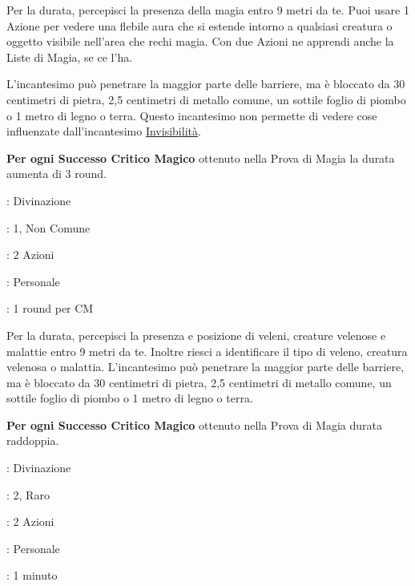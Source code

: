 \begin{multicols}{2}
Per la durata, percepisci la presenza della magia entro 9 metri da te. Puoi usare 1 Azione per vedere una flebile aura che si estende intorno a qualsiasi creatura o oggetto visibile nell'area che rechi magia. Con due Azioni ne apprendi anche la Liste di Magia, se ce l'ha.

L'incantesimo può penetrare la maggior parte delle barriere, ma è bloccato da 30 centimetri di pietra, 2,5 centimetri di metallo comune, un sottile foglio di piombo o 1 metro di legno o terra. Questo incantesimo non permette di vedere cose influenzate dall'incantesimo \hyperlink{Invisibilità}{Invisibilità}.

\textbf{Per ogni Successo Critico Magico} ottenuto nella Prova di Magia la durata aumenta di 3 round.

\noindent\colorbox{OBSSgold!10}{
\begin{minipage}{0.95\linewidth}
\begin{description}[noitemsep, topsep=0pt, parsep=0pt, partopsep=0pt, leftmargin=0cm, labelwidth=1.3cm]
	\item[\textbf{Lista}]: Divinazione
	\item[\textbf{Livello}]: 1, Non Comune
	\item[\textbf{Lancio}]: 2 Azioni
	\item[\textbf{Gittata}]: Personale
	\item[\textbf{Durata}]: 1 round per CM
\end{description}
\end{minipage}}\smallskip

Per la durata, percepisci la presenza e posizione di veleni, creature velenose e malattie entro 9 metri da te. Inoltre riesci a identificare il tipo di veleno, creatura velenosa o malattia. L'incantesimo può penetrare la maggior parte delle barriere, ma è bloccato da 30 centimetri di pietra, 2,5 centimetri di metallo comune, un sottile foglio di piombo o 1 metro di legno o terra.

\textbf{Per ogni Successo Critico Magico} ottenuto nella Prova di Magia durata raddoppia.

\noindent\colorbox{OBSSgold!10}{
\begin{minipage}{0.95\linewidth}
\begin{description}[noitemsep, topsep=0pt, parsep=0pt, partopsep=0pt, leftmargin=0cm, labelwidth=1.3cm]
	\item[\textbf{Lista}]: Divinazione
	\item[\textbf{Livello}]: 2, Raro
	\item[\textbf{Lancio}]: 2 Azioni
	\item[\textbf{Gittata}]: Personale
	\item[\textbf{Durata}]: 1 minuto
\end{description}
\end{minipage}}\smallskip


\end{multicols}
